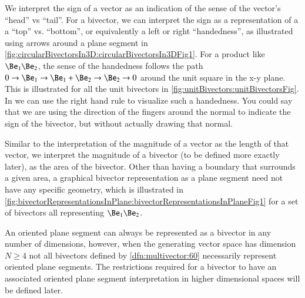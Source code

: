 We interpret the sign of a vector as an indication of the sense of the vector's ``head'' vs ``tail''.
For a bivector, we can interpret the sign as a representation of a
a ``top'' vs. ``bottom'', or equivalently a left or right ``handedness'', as illustrated using arrows around a plane segment in
\cref{fig:circularBivectorsIn3D:circularBivectorsIn3DFig1}.
For a product like \( \Be_1 \Be_2 \), the sense of the handedness follows the path \( 0 \rightarrow \Be_1 \rightarrow \Be_1 + \Be_2 \rightarrow \Be_2 \rightarrow 0 \) around the unit square in the x-y plane.
This is illustrated for all the unit bivectors in \cref{fig:unitBivectors:unitBivectorsFig}.
In  we can use the right hand rule to visualize such a handedness.  You could say that we are using the direction of the fingers around the normal to indicate the sign of the bivector, but without actually drawing that normal.

Similar to the interpretation of the magnitude of a vector as the length of that vector, we interpret the magnitude of a bivector (to be defined more exactly later), as the area of the bivector.
Other than having a boundary that surrounds a given area, a graphical bivector representation as a plane segment need not have any specific geometry, which is illustrated in
\cref{fig:bivectorRepresentationsInPlane:bivectorRepresentationsInPlaneFig1} for a set of bivectors all representing \( \Be_1 \Be_2 \).

An oriented plane segment can always be represented as a bivector in any number of dimensions, however, when the generating vector space has dimension \( N \ge 4 \) not all bivectors defined by \cref{dfn:multivector:60} necessarily represent oriented plane segments.
The restrictions required for a bivector to have an associated oriented plane segment interpretation in higher dimensional spaces will be defined later.

